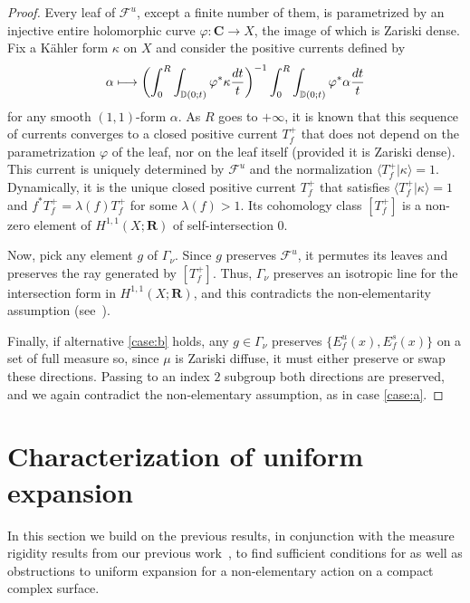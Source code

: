 \documentclass[JEP,XML,SOM,Unicode,published]{cedram}
\newcommand\mto{\mathchoice{\longmapsto}{\mapsto}{\mapsto}{\mapsto}}
\newcommand{\bblrpar}[1]{\biggl(#1\biggr)}
\newcommand{\disk}{\mathbb{D}}
\def\C{\mathbf{C}}
\def\R{\mathbf{R}}
\theoremstyle{plain}
\theoremstyle{definition}
\begin{document}
\begin{proof}
Every leaf of $\mathcal F^u$, except a finite number of them, is parametrized by an injective entire holomorphic curve $\varphi\colon \C\to X$, the image of which is Zariski dense.
Fix a Kähler form $\kappa$ on $X$ and consider the positive currents defined by
\begin{equation*}
\alpha\mto \bblrpar{\int_0^R\int_{\disk(0;t)} \varphi^*\kappa \frac{dt}{t}}^{-1} \int_0^R\int_{\disk(0;t)} \varphi^*\alpha \frac{dt}{t}
\end{equation*}
for any smooth $(1,1)$-form $\alpha$. As $R$ goes to $+\infty$, it is known that this sequence of currents converges to a closed positive current $T^+_f$
that does not depend on the parametrization $\varphi$ of the leaf, nor on the leaf itself (provided it is Zariski dense).
This current is uniquely determined by $\mathcal F^u$ and the normalization $\langle T^+_f\vert \kappa \rangle= 1$. Dynamically, it is
the unique closed positive current $T^+_f$ that satisfies $\langle T^+_f\vert \kappa \rangle= 1$ and $f^*T^+_f=\lambda(f)T^+_f$ for some $\lambda(f)>1$.
Its cohomology class $[T^+_f]$ is a non-zero element of $H^{1,1}(X;\R)$ of self-intersection $0$.

Now, pick any element $g$ of $\Gamma_\nu$. Since $g$ preserves $\mathcal F^u$, it permutes its leaves and preserves the ray generated by $[T^+_f]$.
Thus, $\Gamma_\nu$ preserves an isotropic line for the intersection form in $H^{1,1}(X;\R)$, and this contradicts the non-elementarity assumption (see~\cite[\S 2.3]{stiffness}).

Finally, if alternative \eqref{case:b} holds, any $g\in \Gamma_\nu$ preserves
$ \{E^u_f(x), E^s_f(x)\}$ on a set of full measure so,
since $\mu$ is Zariski diffuse,
it must either preserve or
swap these directions. Passing to an index $2$ subgroup both directions are preserved, and we again contradict the non-elementary assumption, as in case \eqref{case:a}.
\end{proof}

\section{Characterization of uniform expansion}\label{sec:characterization}
In this section we build on the previous results, in conjunction with the measure rigidity
results from our previous work~\cite{stiffness},
to find sufficient conditions for as well as obstructions to
uniform expansion for a non-elementary action on a compact complex surface.

\end{document}
